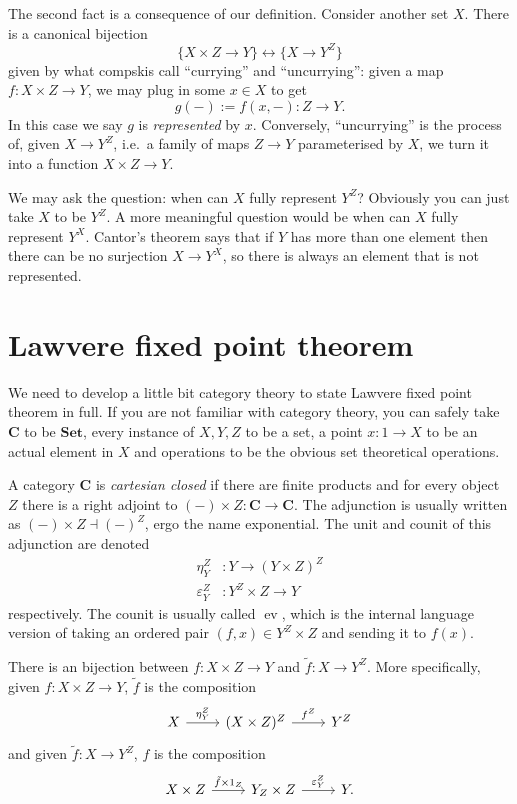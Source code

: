 \documentclass[a4paper]{article}
\renewcommand{\c}[1]{\mathbf{#1}}
\newcommand{\Set}{{\c{Set}}}
\begin{document}
The second fact is a consequence of our definition. Consider another set \(X\). There is a canonical bijection
\[
  \{X \times Z \to Y\} \leftrightarrow \{X \to Y^Z\}
\]
given by what compskis call ``currying'' and ``uncurrying'': given a map \(f: X \times Z \to Y\), we may plug in some \(x \in X\) to get
\[
  g(-) := f(x, -): Z \to Y.
\]
In this case we say \(g\) is \emph{represented} by \(x\). Conversely, ``uncurrying'' is the process of, given \(X \to Y^Z\), i.e.\ a family of maps \(Z \to Y\) parameterised by \(X\), we turn it into a function \(X \times Z \to Y\).

We may ask the question: when can \(X\) fully represent \(Y^Z\)? Obviously you can just take \(X\) to be \(Y^Z\). A more meaningful question would be when can \(X\) fully represent \(Y^X\). Cantor's theorem says that if \(Y\) has more than one element then there can be no surjection \(X \to Y^X\), so there is always an element that is not represented.

\section{Lawvere fixed point theorem}

We need to develop a little bit category theory to state Lawvere fixed point theorem in full. If you are not familiar with category theory, you can safely take \(\c C\) to be \(\Set\), every instance of \(X, Y, Z\) to be a set, a point \(x: 1 \to X\) to be an actual element in \(X\) and operations to be the obvious set theoretical operations.

A category \(\c C\) is \emph{cartesian closed} if there are finite products and for every object \(Z\) there is a right adjoint to \((-) \times Z: \c C \to \c C\). The adjunction is usually written as \((-) \times Z \dashv (-)^Z\), ergo the name exponential. The unit and counit of this adjunction are denoted
\begin{align*}
  \eta^Z_Y &: Y \to (Y \times Z)^Z \\
  \varepsilon^Z_Y &: Y^Z \times Z \to Y
\end{align*}
respectively. The counit is usually called \(\operatorname{ev}\), which is the internal language version of taking an ordered pair \((f, x) \in Y^Z \times Z\) and sending it to \(f(x)\).

There is an bijection between \(f: X \times Z \to Y\) and \(\tilde f: X \to Y^Z\). More specifically, given \(f: X \times Z \to Y\), \(\tilde f\) is the composition
\[
  \begin{tikzcd}
    X \ar[r, "\eta_Y^Z"] & (X \times Z)^Z \ar[r, "f^Z"] & Y^Z
  \end{tikzcd}
\]
and given \(\tilde f: X \to Y^Z\), \(f\) is the composition
\[
  \begin{tikzcd}
    X \times Z \ar[r, "\tilde f \times 1_Z"] & Y_Z \times Z \ar[r, "\varepsilon^Z_Y"] & Y.
  \end{tikzcd}
\]
\end{document}
